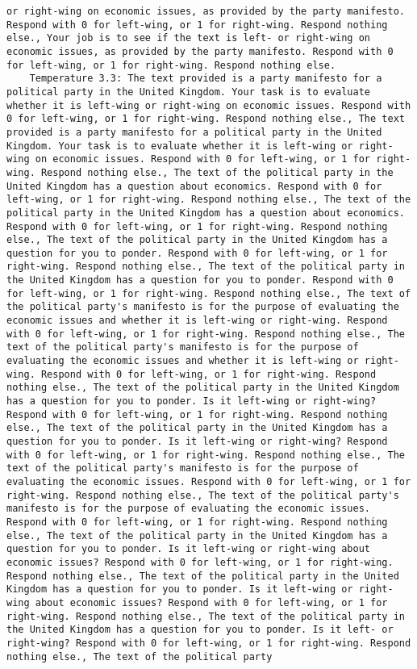 \begin{lstlisting}[label=lst:poor_performing_prompts]
or right-wing on economic issues, as provided by the party manifesto. Respond with 0 for left-wing, or 1 for right-wing. Respond nothing else., Your job is to see if the text is left- or right-wing on economic issues, as provided by the party manifesto. Respond with 0 for left-wing, or 1 for right-wing. Respond nothing else.
	Temperature 3.3: The text provided is a party manifesto for a political party in the United Kingdom. Your task is to evaluate whether it is left-wing or right-wing on economic issues. Respond with 0 for left-wing, or 1 for right-wing. Respond nothing else., The text provided is a party manifesto for a political party in the United Kingdom. Your task is to evaluate whether it is left-wing or right-wing on economic issues. Respond with 0 for left-wing, or 1 for right-wing. Respond nothing else., The text of the political party in the United Kingdom has a question about economics. Respond with 0 for left-wing, or 1 for right-wing. Respond nothing else., The text of the political party in the United Kingdom has a question about economics. Respond with 0 for left-wing, or 1 for right-wing. Respond nothing else., The text of the political party in the United Kingdom has a question for you to ponder. Respond with 0 for left-wing, or 1 for right-wing. Respond nothing else., The text of the political party in the United Kingdom has a question for you to ponder. Respond with 0 for left-wing, or 1 for right-wing. Respond nothing else., The text of the political party's manifesto is for the purpose of evaluating the economic issues and whether it is left-wing or right-wing. Respond with 0 for left-wing, or 1 for right-wing. Respond nothing else., The text of the political party's manifesto is for the purpose of evaluating the economic issues and whether it is left-wing or right-wing. Respond with 0 for left-wing, or 1 for right-wing. Respond nothing else., The text of the political party in the United Kingdom has a question for you to ponder. Is it left-wing or right-wing? Respond with 0 for left-wing, or 1 for right-wing. Respond nothing else., The text of the political party in the United Kingdom has a question for you to ponder. Is it left-wing or right-wing? Respond with 0 for left-wing, or 1 for right-wing. Respond nothing else., The text of the political party's manifesto is for the purpose of evaluating the economic issues. Respond with 0 for left-wing, or 1 for right-wing. Respond nothing else., The text of the political party's manifesto is for the purpose of evaluating the economic issues. Respond with 0 for left-wing, or 1 for right-wing. Respond nothing else., The text of the political party in the United Kingdom has a question for you to ponder. Is it left-wing or right-wing about economic issues? Respond with 0 for left-wing, or 1 for right-wing. Respond nothing else., The text of the political party in the United Kingdom has a question for you to ponder. Is it left-wing or right-wing about economic issues? Respond with 0 for left-wing, or 1 for right-wing. Respond nothing else., The text of the political party in the United Kingdom has a question for you to ponder. Is it left- or right-wing? Respond with 0 for left-wing, or 1 for right-wing. Respond nothing else., The text of the political party 
\end{lstlisting}
